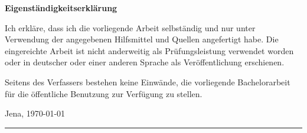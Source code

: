 \documentclass[crop=false]{standalone}
\begin{document}
  \thispagestyle{empty}

  \noindent
  {\Large \bfseries Eigenständigkeitserklärung}
  \vspace{\baselineskip}

  \noindent
  Ich erkläre, dass ich die vorliegende Arbeit selbständig und nur unter Verwendung der angegebenen
  Hilfsmittel und Quellen angefertigt habe. Die eingereichte Arbeit ist nicht anderweitig als Prüfungsleistung
  verwendet worden oder in deutscher oder einer anderen Sprache als Veröffentlichung erschienen.

  \noindent
  Seitens des Verfassers bestehen keine Einwände, die vorliegende
  Bachelorarbeit für die öffentliche Benutzung zur Verfügung zu stellen.

  \vspace{2\baselineskip}

  \noindent
  Jena, \today

  \noindent
  \hfill\rule{0.4\textwidth}{0.5pt}
  \vspace{0.1pt} \\
  {\\}
  \restoregeometry
\end{document}
